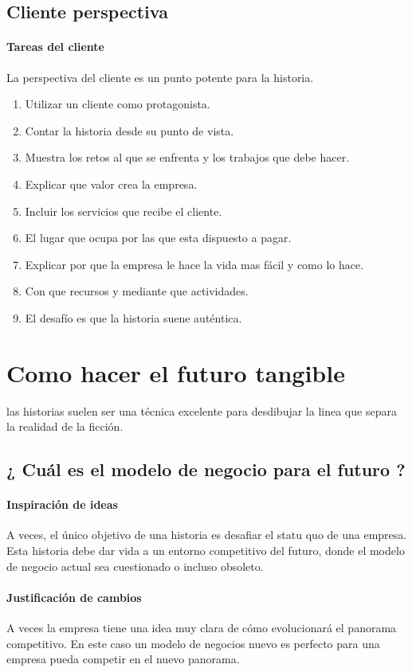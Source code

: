 \documentclass[11pt]{book}
\begin{document}
\subsection{Cliente perspectiva}
\paragraph{Tareas del cliente}
La perspectiva del cliente es un punto potente para la historia.
\begin{enumerate}
\item Utilizar un cliente como protagonista.
\item Contar la historia desde su punto de vista.
\item Muestra los retos al que se enfrenta y los trabajos que debe hacer.
\item Explicar que valor crea la empresa.
\item Incluir los servicios que recibe el cliente.
\item El lugar que ocupa por las que esta dispuesto a pagar.
\item Explicar por que la empresa le hace la vida mas fácil y como lo hace.
\item Con que recursos y mediante que actividades.
\item El desafío es que la historia suene auténtica.
\end{enumerate}
\section{Como hacer el futuro tangible}
las historias suelen ser una técnica excelente para desdibujar la linea que separa la realidad de la ficción.
\subsection{¿ Cuál es el modelo de negocio para el futuro ?}
\paragraph{Inspiración de ideas}
A veces, el único objetivo de una historia es desafiar el statu quo de una empresa. Esta historia debe dar vida a un entorno competitivo del futuro, donde el modelo de negocio actual sea cuestionado o incluso obsoleto.
\paragraph{Justificación de cambios}
A veces la empresa tiene una idea muy clara de cómo evolucionará el panorama competitivo. En este caso un modelo de negocios nuevo es perfecto para una empresa pueda competir en el nuevo panorama.
\end{document}
